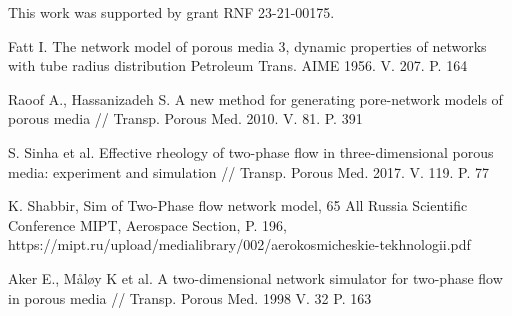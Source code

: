 \documentclass[11pt]{article}
\begin{document}
	This work was supported by grant RNF 23-21-00175.
	\begin{thebibliography}{}
			 Fatt I. The network model of porous media 3, dynamic properties of networks with tube radius distribution Petroleum Trans. AIME 1956. V. 207. P. 164
		
			Raoof A., Hassanizadeh S. A new method for generating pore-network models of porous media // Transp. Porous Med. 2010. V. 81. P. 391
			 
			S. Sinha et al. Effective rheology of two-phase flow in three-dimensional porous media: experiment and simulation // Transp. Porous Med. 2017. V. 119. P. 77
			
			K. Shabbir, Sim of Two-Phase flow network model, 65 All Russia Scientific Conference MIPT, Aerospace Section, P. 196, https://mipt.ru/upload/medialibrary/002/aerokosmicheskie-tekhnologii.pdf
			
			Aker E., Måløy K et al. A two-dimensional network simulator for two-phase flow in porous media // Transp. Porous Med. 1998 V. 32 P. 163
	
	\end{thebibliography}
\end{document}
